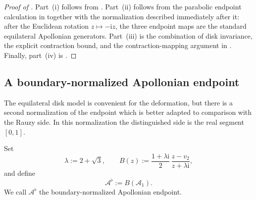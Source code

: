 \documentclass[11pt]{amsart}
\theoremstyle{definition}
\newcommand{\ii}{\mathrm{i}}
\begin{document}
\begin{proof}[Proof of ]
Part~\textup{(i)} follows from . Part~\textup{(ii)} follows from the parabolic endpoint calculation in  together with the normalization described immediately after it: after the Euclidean rotation $z\mapsto-\ii z$, the three endpoint maps are the standard equilateral Apollonian generators. Part~\textup{(iii)} is the combination of disk invariance, the explicit contraction bound, and the contraction-mapping argument in . Finally, part~\textup{(iv)} is .
\end{proof}

\subsection{A boundary-normalized Apollonian endpoint}\label{ap:subsec:boundary-normalized}
The equilateral disk model is convenient for the deformation, but there is a second normalization of the endpoint which is better adapted to comparison with the Rauzy side.  In this normalization the distinguished side is the real segment $[0,1]$.

Set
\[
  \lambda:=2+\sqrt3,
  \qquad
  B(z):=\frac{1+\lambda\ii}{2}\,\frac{z-v_2}{z+\lambda\ii},
\]
and define
\[
  \mathcal A^{\flat}:=B(\mathcal A_1).
\]
We call $\mathcal A^{\flat}$ the boundary-normalized Apollonian endpoint.
\end{document}
